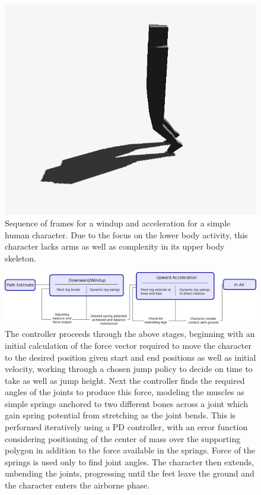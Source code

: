 \documentclass[landscape,26pt]{sciposter}
\begin{document}
\begin{minipage}[t]{17in}
\begin{figure}
            \includegraphics[width=0.2\columnwidth]{jump_sequence/jump8Cropped.png}
			\caption{Sequence of frames for a windup and acceleration for a simple human character.  Due to the focus on the lower body activity, this character lacks arms as well as complexity in its upper body skeleton.}
		\end{figure}

        \begin{figure}
            \centering
            \includegraphics[width=0.8\columnwidth]{system_diag_horiz.eps}
            \caption{The controller proceeds through the above stages, beginning with an initial calculation of the force vector required to move the character to the desired position given start and end positions as well as initial velocity, working through a chosen jump policy to decide on time to take as well as jump height.  Next the controller finds the required angles of the joints to produce this force, modeling the muscles as simple springs anchored to two different bones across a joint which gain spring potential from stretching as the joint bends.  This is performed iteratively using a PD controller, with an error function considering positioning of the center of mass over the supporting polygon in addition to the force available in the springs.  Force of the springs is used only to find joint angles.  The character then extends, unbending the joints, progressing until the feet leave the ground and the character enters the airborne phase.}
        \end{figure}


\end{minipage}
\end{document}
